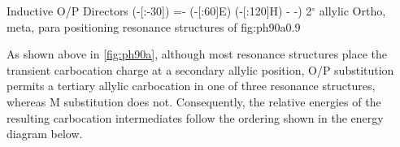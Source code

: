 \begin{core}{Inductive O/P Directors}
{{{{{                  (-[:-30])
                  =-
                  (-[:60]E)
                  (-[:120]H)
                  -
                  -)
                }
              }
            }{2$^\circ$ allylic}
          }
        }{
        }{Ortho, meta, para positioning resonance structures of }{fig:ph90a}{0.9}

        As shown above in \autoref{fig:ph90a}, although most resonance structures place the transient carbocation charge at a secondary allylic position, O/P substitution permits a tertiary allylic carbocation in one of three resonance structures, whereas M substitution does not. Consequently, the relative energies of the resulting carbocation intermediates follow the ordering shown in the energy diagram below.

\end{core}
